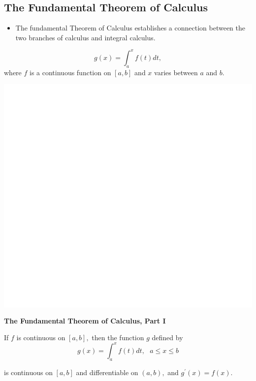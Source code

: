 \documentclass[]{book}
\providecommand{\tightlist}{%
  \setlength{\itemsep}{0pt}\setlength{\parskip}{0pt}}
\begin{document}
\newpage

\hypertarget{the-fundamental-theorem-of-calculus}{%
\subsection{The Fundamental Theorem of Calculus}\label{the-fundamental-theorem-of-calculus}}

\begin{itemize}
\tightlist
\item
  The fundamental Theorem of Calculus establishes a connection between the two branches of calculus and integral calculus.
\end{itemize}

\[g(x) = \int_a^x f(t) dt,\]
where \(f\) is a continuous function on \([a,b]\) and \(x\) varies between \(a\) and \(b\).

\begin{center}\includegraphics[width=1\linewidth]{figure/LB37-1} \end{center}

\textbf{The Fundamental Theorem of Calculus, Part I}

If \(f\) is continuous on \([a,b],\) then the function \(g\) defined by
\[g(x) = \int_a^x f(t) dt,\text{   } a\leq x \leq b\]

is continuous on \([a,b]\) and differentiable on \((a,b),\) and \(g^\prime(x) = f(x).\)
\end{document}
